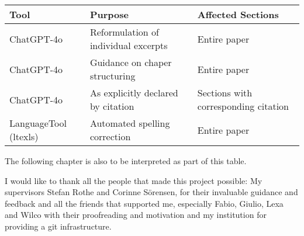 \begin{table}[H]
    \begin{tabular}{lll}
        Tool & Purpose & Affected Sections \\ \hline
        ChatGPT-4o & Reformulation of individual excerpts & Entire paper \\
        ChatGPT-4o & Guidance on chaper structuring & Entire paper \\
        ChatGPT-4o & As explicitly declared by citation & Sections with corresponding citation \\
        LanguageTool (ltexls) & Automated spelling correction & Entire paper \\
    \end{tabular}

\end{table}
The following chapter is also to be interpreted as part of this table.

\begingroup
\renewcommand{\cleardoublepage}{}
\renewcommand{\clearpage}{}
\label{chap:ack}
\endgroup
I would like to thank all the people that made this project possible: My supervisors Stefan Rothe and Corinne Sörensen, for their invaluable guidance and feedback and all the friends that supported me, especially Fabio, Giulio, Lexa and Wilco with their proofreading and motivation and my institution for providing a git infrastructure.
